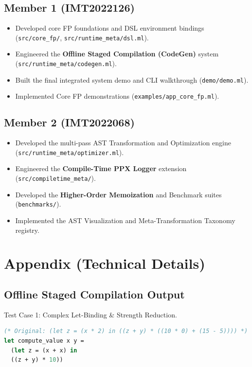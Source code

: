\documentclass[12pt]{article}
\begin{document}
\subsection*{Member 1 (IMT2022126)}
\begin{itemize}
    \item Developed core FP foundations and DSL environment bindings (\texttt{src/core\_fp/}, \texttt{src/runtime\_meta/dsl.ml}).
    \item Engineered the \textbf{Offline Staged Compilation (CodeGen)} system (\texttt{src/runtime\_meta/codegen.ml}).
    \item Built the final integrated system demo and CLI walkthrough (\texttt{demo/demo.ml}).
    \item Implemented Core FP demonstrations (\texttt{examples/app\_core\_fp.ml}).
\end{itemize}

\subsection*{Member 2 (IMT2022068)}
\begin{itemize}
    \item Developed the multi-pass AST Transformation and Optimization engine (\texttt{src/runtime\_meta/optimizer.ml}).
    \item Engineered the \textbf{Compile-Time PPX Logger} extension (\texttt{src/compiletime\_meta/}).
    \item Developed the \textbf{Higher-Order Memoization} and Benchmark suites (\texttt{benchmarks/}).
    \item Implemented the AST Visualization and Meta-Transformation Taxonomy registry.
\end{itemize}

\vspace{1em}

\section*{Appendix (Technical Details)}

\subsection*{Offline Staged Compilation Output}
Test Case 1: Complex Let-Binding \& Strength Reduction.
\begin{lstlisting}[language=Caml]
(* Original: (let z = (x * 2) in ((z + y) * ((10 * 0) + (15 - 5)))) *)
let compute_value x y =
  (let z = (x + x) in
  ((z + y) * 10))
\end{lstlisting}
\end{document}

